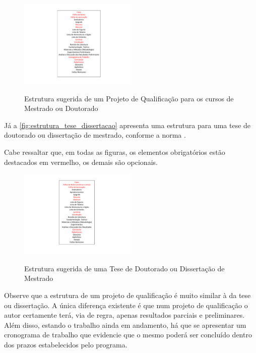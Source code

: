 \begin{apendicesenv}
\begin{figure}[!htb]
    \centering
    \caption{Estrutura sugerida de um Projeto de Qualificação para os cursos de Mestrado ou Doutorado}
    \includegraphics[width=0.5\textwidth]{./04-figuras/estrutura-projeto-qualificacao}
    \label{fig:estrutura_projeto_qualificacao}
\end{figure}

Já a \autoref{fig:estrutura_tese_dissertacao} apresenta uma estrutura para uma tese de doutorado ou dissertação de mestrado, conforme a norma .

Cabe ressaltar que, em todas as figuras, os elementos obrigatórios estão destacados em vermelho, os demais são opcionais.

\begin{figure}[!htb]
    \centering
    \caption{Estrutura sugerida de uma Tese de Doutorado ou Dissertação de Mestrado}
    \includegraphics[width=0.5\textwidth]{./04-figuras/estrutura-tese-dissertacao}
    \label{fig:estrutura_tese_dissertacao}
\end{figure}

Observe que a estrutura de um projeto de qualificação é muito similar à da tese ou dissertação. A única diferença existente é que num projeto de qualificação o autor certamente terá, via de regra, apenas resultados parciais e preliminares. Além disso, estando o trabalho ainda em andamento, há que se apresentar um cronograma de trabalho que evidencie que o mesmo poderá ser concluído dentro dos prazos estabelecidos pelo programa.


\end{apendicesenv}
